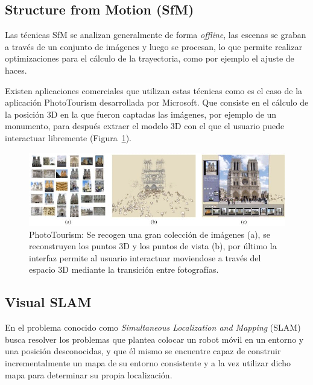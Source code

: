 \subsection{Structure from Motion (SfM)}

Las técnicas SfM se analizan generalmente de forma \textit{offline}, las escenas se graban a través de un conjunto de imágenes y luego se procesan, lo que permite realizar optimizaciones para el cálculo de la trayectoria, como por ejemplo el ajuste de haces.

Existen aplicaciones comerciales que utilizan estas técnicas como es el caso de la aplicación PhotoTourism \parencite{Reference2} desarrollada por Microsoft. Que consiste en el cálculo de la posición 3D en la que fueron captadas las imágenes, por ejemplo de un monumento, para después extraer el modelo 3D con el que el usuario puede interactuar libremente (Figura~\ref{fig:Tourism}).

\begin{figure}[th]
\centering
\includegraphics[scale=0.57]{Figures/phototourism.png}
\decoRule
\caption[PhotoTourism]{PhotoTourism: Se recogen una gran colección de imágenes (a), se reconstruyen los puntos 3D y los puntos de vista (b), por último la interfaz permite al usuario interactuar moviendose a través del espacio 3D mediante la transición entre fotografías.}
\label{fig:Tourism}
\end{figure}

\subsection{Visual SLAM}

En el problema conocido como \textit{Simultaneous Localization and Mapping} (SLAM) busca resolver los problemas que plantea colocar un robot móvil en un entorno y una posición desconocidas, y que él mismo se encuentre capaz de construir incrementalmente un mapa de su entorno consistente y a la vez utilizar dicho mapa para determinar su propia localización.

